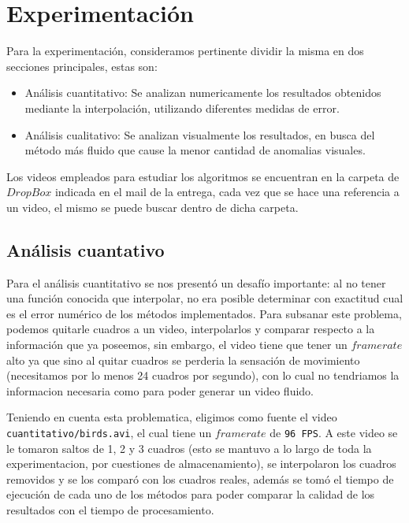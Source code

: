 \section{Experimentación}

Para la experimentación, consideramos pertinente dividir la misma en dos secciones principales, estas son:

\begin{itemize}
	\item Análisis cuantitativo: Se analizan numericamente los resultados obtenidos mediante la interpolación, utilizando diferentes medidas de error.
	\item Análisis cualitativo: Se analizan visualmente los resultados, en busca del método más fluido que cause la menor cantidad de anomalias visuales.
\end{itemize}

Los videos empleados para estudiar los algoritmos se encuentran en la carpeta de $DropBox$ indicada en el mail de la entrega, cada vez que se hace una referencia a un video, el mismo se puede buscar dentro de dicha carpeta.

\subsection{Análisis cuantativo}

Para el análisis cuantitativo se nos presentó un desafío importante: al no tener una función conocida que interpolar, no era posible determinar con exactitud cual es el error numérico de los métodos implementados. Para subsanar este problema, podemos quitarle cuadros a un video, interpolarlos y comparar respecto a la información que ya poseemos, sin embargo, el video tiene que tener un $framerate$ alto ya que sino al quitar cuadros se perderia la sensación de movimiento (necesitamos por lo menos 24 cuadros por segundo), con lo cual no tendriamos la informacion necesaria como para poder generar un video fluido.

Teniendo en cuenta esta problematica, eligimos como fuente el video \texttt{cuantitativo/birds.avi}, el cual tiene un $framerate$ de \texttt{96 FPS}. A este video se le tomaron saltos de 1, 2 y 3 cuadros (esto se mantuvo a lo largo de toda la experimentacion, por cuestiones de almacenamiento), se interpolaron los cuadros removidos y se los comparó con los cuadros reales, además se tomó el tiempo de ejecución de cada uno de los métodos para poder comparar la calidad de los resultados con el tiempo de procesamiento.


